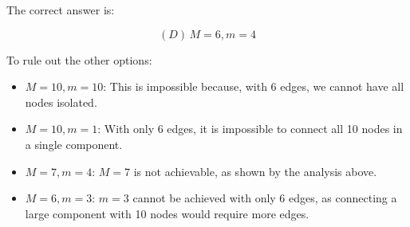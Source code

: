 \documentclass[12pt]{article}
\theoremstyle{plain}
\begin{document}
 The correct answer is:

\[
\boxed{(D) \, M = 6, m = 4}
\]

\noindent To rule out the other options:

\begin{itemize}
    \item[(A)] \( M = 10, m = 10 \): This is impossible because, with 6 edges, we cannot have all nodes isolated.
    \item[(B)] \( M = 10, m = 1 \): With only 6 edges, it is impossible to connect all 10 nodes in a single component.
    \item[(C)] \( M = 7, m = 4 \): \( M = 7 \) is not achievable, as shown by the analysis above.
    \item[(E)] \( M = 6, m = 3 \): \( m = 3 \) cannot be achieved with only 6 edges, as connecting a large component with 10 nodes would require more edges.
\end{itemize}
\end{document}
